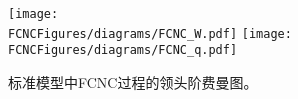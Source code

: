 
\begin{figure}[H]
\centering
\texttt{[image: \\FCNCFigures/diagrams/FCNC\_W.pdf]}
\texttt{[image: \\FCNCFigures/diagrams/FCNC\_q.pdf]}\\
\caption{标准模型中FCNC过程的领头阶费曼图。}
\label{fig:SMFCNC}
\end{figure}
